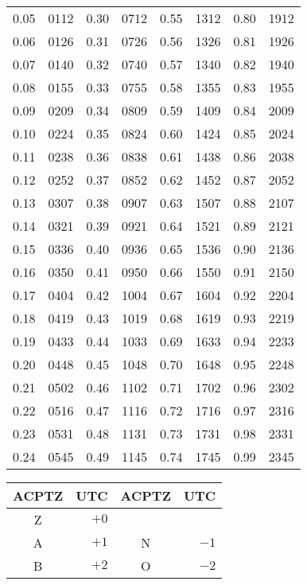 \documentclass[10pt]{book}
\begin{document}
\begin{center}
\begin{tabular}{rr|rr|rr|rr}
        0.05 & 0112 & 0.30 & 0712 & 0.55 & 1312 & 0.80 & 1912 \\
        0.06 & 0126 & 0.31 & 0726 & 0.56 & 1326 & 0.81 & 1926 \\
        0.07 & 0140 & 0.32 & 0740 & 0.57 & 1340 & 0.82 & 1940 \\
        0.08 & 0155 & 0.33 & 0755 & 0.58 & 1355 & 0.83 & 1955 \\
        0.09 & 0209 & 0.34 & 0809 & 0.59 & 1409 & 0.84 & 2009 \\
        0.10 & 0224 & 0.35 & 0824 & 0.60 & 1424 & 0.85 & 2024 \\
        0.11 & 0238 & 0.36 & 0838 & 0.61 & 1438 & 0.86 & 2038 \\
        0.12 & 0252 & 0.37 & 0852 & 0.62 & 1452 & 0.87 & 2052 \\
        0.13 & 0307 & 0.38 & 0907 & 0.63 & 1507 & 0.88 & 2107 \\
        0.14 & 0321 & 0.39 & 0921 & 0.64 & 1521 & 0.89 & 2121 \\
        0.15 & 0336 & 0.40 & 0936 & 0.65 & 1536 & 0.90 & 2136 \\
        0.16 & 0350 & 0.41 & 0950 & 0.66 & 1550 & 0.91 & 2150 \\
        0.17 & 0404 & 0.42 & 1004 & 0.67 & 1604 & 0.92 & 2204 \\
        0.18 & 0419 & 0.43 & 1019 & 0.68 & 1619 & 0.93 & 2219 \\
        0.19 & 0433 & 0.44 & 1033 & 0.69 & 1633 & 0.94 & 2233 \\
        0.20 & 0448 & 0.45 & 1048 & 0.70 & 1648 & 0.95 & 2248 \\
        0.21 & 0502 & 0.46 & 1102 & 0.71 & 1702 & 0.96 & 2302 \\
        0.22 & 0516 & 0.47 & 1116 & 0.72 & 1716 & 0.97 & 2316 \\
        0.23 & 0531 & 0.48 & 1131 & 0.73 & 1731 & 0.98 & 2331 \\
        0.24 & 0545 & 0.49 & 1145 & 0.74 & 1745 & 0.99 & 2345 \\
        \bottomrule
    \end{tabular}
    \hfill
    \begin{tabular}{cr|cr}
        \toprule
        \textbf{ACPTZ} & \textbf{UTC} & \textbf{ACPTZ} & \textbf{UTC} \\
        \midrule
        Z & $ +0$ &   &       \\
        A & $ +1$ & N &  $-1$ \\
        B & $ +2$ & O &  $-2$ \\

\end{tabular}
\end{center}
\end{document}
